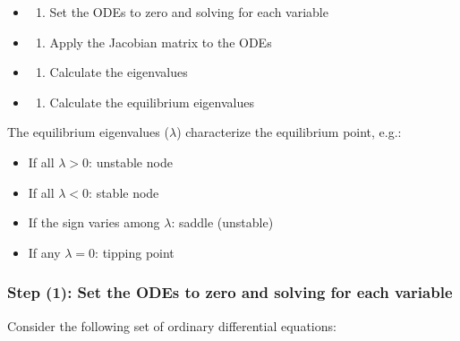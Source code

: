 \documentclass[
]{article}
\providecommand{\tightlist}{%
  \setlength{\itemsep}{0pt}\setlength{\parskip}{0pt}}
\begin{document}
\begin{itemize}
\item
  \begin{enumerate}
  \def\labelenumi{(\arabic{enumi})}
  \tightlist
  \item
    Set the ODEs to zero and solving for each variable
  \end{enumerate}
\item
  \begin{enumerate}
  \def\labelenumi{(\arabic{enumi})}
  \setcounter{enumi}{1}
  \tightlist
  \item
    Apply the Jacobian matrix to the ODEs
  \end{enumerate}
\item
  \begin{enumerate}
  \def\labelenumi{(\arabic{enumi})}
  \setcounter{enumi}{2}
  \tightlist
  \item
    Calculate the eigenvalues
  \end{enumerate}
\item
  \begin{enumerate}
  \def\labelenumi{(\arabic{enumi})}
  \setcounter{enumi}{3}
  \tightlist
  \item
    Calculate the equilibrium eigenvalues
  \end{enumerate}
\end{itemize}

The equilibrium eigenvalues (\(\lambda\)) characterize the equilibrium
point, e.g.:

\begin{itemize}
\tightlist
\item
  If all \(\lambda > 0\): unstable node
\item
  If all \(\lambda < 0\): stable node
\item
  If the sign varies among \(\lambda\): saddle (unstable)
\item
  If any \(\lambda = 0\): tipping point
\end{itemize}

\hypertarget{step-1-set-the-odes-to-zero-and-solving-for-each-variable}{%
\subsubsection{Step (1): Set the ODEs to zero and solving for each
variable}\label{step-1-set-the-odes-to-zero-and-solving-for-each-variable}}

Consider the following set of ordinary differential equations:
\end{document}
